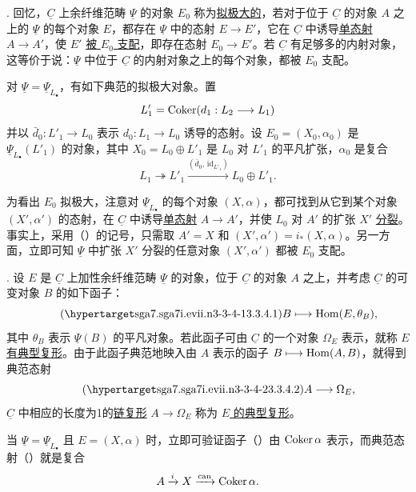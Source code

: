 . 回忆，$\underline C$ 上余纤维范畴 $\underline\Psi$ 的对象 $E_0$ 称为\underline{拟极大的}，若对于位于 $\underline C$ 的对象 $A$ 之上的 $\underline\Psi$ 的每个对象 $E$，都存在 $\underline\Psi$ 中的态射 $E\longrightarrow E'$，它在 $\underline C$ 中诱导\underline{单态射} $A\longrightarrow A'$，使 $E'$ \underline{被 $E_0$ 支配}，即存在态射 $E_0\longrightarrow E'$。若 $\underline C$ 有足够多的内射对象，这等价于说：$\underline\Psi$ 中位于 $\underline C$ 的内射对象之上的每个对象，都被 $E_0$ 支配。

对 $\underline\Psi=\underline\Psi_{L_\bullet}$，有如下典范的拟极大对象。置
\[
 L'_1=\operatorname{Coker}(d_1:L_2\longrightarrow L_1)
\]
并以 $\bar d_0:L'_1\longrightarrow L_0$ 表示 $d_0:L_1\longrightarrow L_0$ 诱导的态射。设 $E_0=(X_0,\alpha_0)$ 是 $\underline\Psi_{L_\bullet}(L'_1)$ 的对象，其中 $X_0=L_0\oplus L'_1$ 是 $L_0$ 对 $L'_1$ 的平凡扩张，$\alpha_0$ 是复合
\[
 L_1\twoheadrightarrow L'_1
 \xrightarrow{(\bar d_0,\,\mathrm{id}_{L'_1})}
 L_0\oplus L'_1.
\]


为看出 $E_0$ 拟极大，注意对 $\underline\Psi_{L_\bullet}$ 的每个对象 $(X,\alpha)$，都可找到从它到某个对象 $(X',\alpha')$ 的态射，在 $\underline C$ 中诱导\underline{单态射} $A\longrightarrow A'$，并使 $L_0$ 对 $A'$ 的扩张 $X'$ \underline{分裂}。事实上，采用（）的记号，只需取 $A'=X$ 和 $(X',\alpha')=i_*(X,\alpha)$。另一方面，立即可知 $\underline\Psi$ 中扩张 $X'$ 分裂的任意对象 $(X',\alpha')$ 都被 $E_0$ 支配。

. 设 $E$ 是 $\underline C$ 上加性余纤维范畴 $\underline\Psi$ 的对象，位于 $\underline C$ 的对象 $A$ 之上，并考虑 $\underline C$ 的可变对象 $B$ 的如下函子：
\begin{equation}\tag{\SGARefTarget{sga7.sga7i.evii.n3-3-4-1}{3.3.4.1}}
 B\longmapsto\Hom(E,\theta_B),
\end{equation}
其中 $\theta_B$ 表示 $\underline\Psi(B)$ 的平凡对象。若此函子可由 $\underline C$ 的一个对象 $\Omega_E$ 表示，就称 $E$ \underline{有典型复形}。由于此函子典范地映入由 $A$ 表示的函子 $B\longmapsto\operatorname{Hom}(A,B)$，就得到典范态射
\begin{equation}\tag{\SGARefTarget{sga7.sga7i.evii.n3-3-4-2}{3.3.4.2}}
 A\longrightarrow\Omega_E,
\end{equation}
$\underline C$ 中相应的长度为1的\underline{链复形} $A\longrightarrow\Omega_E$ 称为 \underline{$E$ 的典型复形}。

当 $\underline\Psi=\underline\Psi_{L_\bullet}$ 且 $E=(X,\alpha)$ 时，立即可验证函子（）由 $\operatorname{Coker}\alpha$ 表示，而典范态射（）就是复合
\[
 A\xrightarrow{i}X\xrightarrow{\mathrm{can}}\operatorname{Coker}\alpha.
\]



